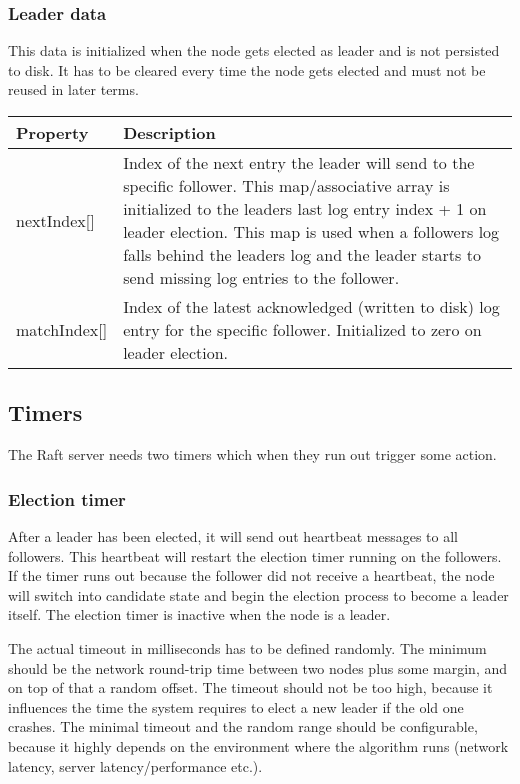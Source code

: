 \subsubsection*{Leader data}

This data is initialized when the node gets elected as leader and is not persisted to disk.
It has to be cleared every time the node gets elected and must not be reused in later terms.

\begin{tabularx}{\textwidth}{ | p{80px} | X | }
\hline
\textbf{Property} & \textbf{Description} \\ \hline
nextIndex[] & Index of the next entry the leader will send to the specific follower. This map/associative array is initialized to the leaders last log entry index + 1 on leader election.
This map is used when a followers log falls behind the leaders log and the leader starts to send missing log entries to the follower. \\ \hline
matchIndex[] & Index of the latest acknowledged (written to disk) log entry for the specific follower. Initialized to zero on leader election. \\ \hline
\end{tabularx}

\subsection{Timers}
The Raft server needs two timers which when they run out trigger some action.

\subsubsection*{Election timer}
After a leader has been elected, it will send out heartbeat messages to all followers. This heartbeat
will restart the election timer running on the followers. If the timer runs out because the follower did not 
receive a heartbeat, the node will switch into candidate state and begin the election process to become a leader itself.
The election timer is inactive when the node is a leader.

The actual timeout in milliseconds has to be defined randomly. The minimum should be the network round-trip time between two nodes plus some margin,
and on top of that a random offset. The timeout should not be too high, because it influences the time the system requires to elect a new leader
if the old one crashes. The minimal timeout and the random range should be configurable, because it highly depends on the environment where the algorithm runs
(network latency, server latency/performance etc.).

